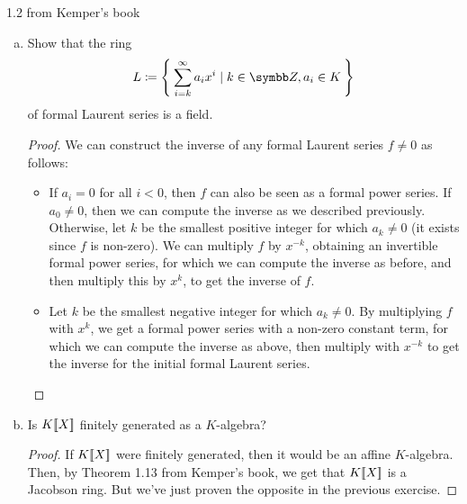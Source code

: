 \begin{problem*}{1.2 from Kemper's book}
\begin{enumerate}[(a)]
    \item Show that the ring
    \[
        L \coloneqq \Set{ \sum_{i = k}^{\infty} a_i x^i \mid k \in \integers, a_i \in K }
    \]
    of formal Laurent series is a field.
    \begin{proof}
    We can construct the inverse of any formal Laurent series \(f \neq 0\) as follows:
    \begin{itemize}
        \item If \(a_i = 0\) for all \(i < 0\), then \(f\) can also be seen as a formal power series. If \(a_0 \neq 0\), then we can compute the inverse as we described previously. Otherwise, let \(k\) be the smallest positive integer for which \(a_k \neq 0\) (it exists since \(f\) is non-zero). We can multiply \(f\) by \(x^{-k}\), obtaining an invertible formal power series, for which we can compute the inverse as before, and then multiply this by \(x^k\), to get the inverse of \(f\).
        \item Let \(k\) be the smallest negative integer for which \(a_k \neq 0\). By multiplying \(f\) with \(x^k\), we get a formal power series with a non-zero constant term, for which we can compute the inverse as above, then multiply with \(x^{-k}\) to get the inverse for the initial formal Laurent series.
    \end{itemize}
    \end{proof}
    
    \item Is \(K [\![X]\!]\) finitely generated as a \(K\)-algebra?
    \begin{proof}
    If \(K [\![X]\!]\) were finitely generated, then it would be an affine \(K\)-algebra. Then, by Theorem 1.13 from Kemper's book, we get that \(K [\![X]\!]\) is a Jacobson ring. But we've just proven the opposite in the previous exercise. 
    \end{proof}
\end{enumerate}
\end{problem*}


